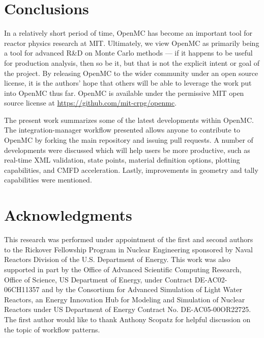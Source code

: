 \documentclass{ansconf}
\begin{document}
\section{Conclusions}

In a relatively short period of time, OpenMC has become an important tool for
reactor physics research at MIT. Ultimately, we view OpenMC as primarily being a
tool for advanced R\&D on Monte Carlo methods --- if it happens to be useful for
production analysis, then so be it, but that is not the explicit intent or goal
of the project. By releasing OpenMC to the wider community under an open source
license, it is the authors' hope that others will be able to leverage the work
put into OpenMC thus far. OpenMC is available under the permissive MIT open
source license at \url{https://github.com/mit-crpg/openmc}.

The present work summarizes some of the latest developments within OpenMC. The
integration-manager workflow presented allows anyone to contribute to OpenMC by
forking the main repository and issuing pull requests. A number of developments
were discussed which will help users be more productive, such as real-time XML
validation, state points, material definition options, plotting capabilities,
and CMFD acceleration. Lastly, improvements in geometry and tally capabilities
were mentioned.

\section*{Acknowledgments}

This research was performed under appointment of the first and second authors to
the Rickover Fellowship Program in Nuclear Engineering sponsored by Naval
Reactors Division of the U.S. Department of Energy. This work was also supported
in part by the Office of Advanced Scientific Computing Research, Office of
Science, US Department of Energy, under Contract DE-AC02-06CH11357 and by the
Consortium for Advanced Simulation of Light Water Reactors, an Energy Innovation
Hub for Modeling and Simulation of Nuclear Reactors under US Department of
Energy Contract No. DE-AC05-00OR22725. The first author would like to thank
Anthony Scopatz for helpful discussion on the topic of workflow patterns.

\setlength{\baselineskip}{12pt}



\end{document}
